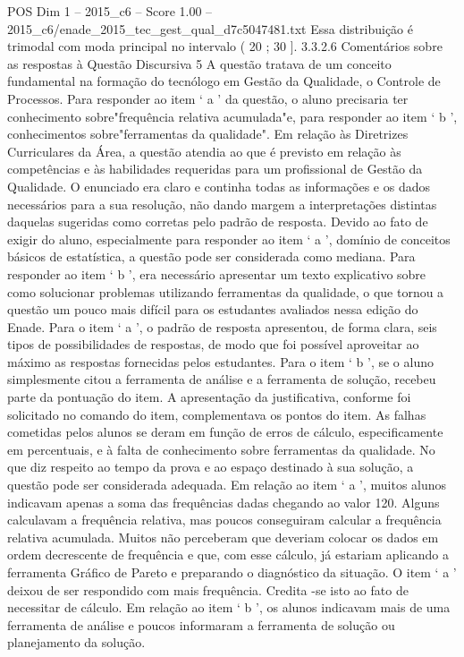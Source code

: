 \begin{textsample}{POS Dim 1 – 2015\_c6 – Score 1.00 – 2015\_c6/enade\_2015\_tec\_gest\_qual\_d7c5047481.txt}
Essa distribuição é trimodal com moda principal no intervalo ( 20 ; 30 ]. 3.3.2.6 Comentários sobre as respostas à Questão Discursiva 5 A questão tratava de um conceito fundamental na formação do tecnólogo em Gestão da Qualidade, o Controle de Processos.
Para responder ao item ‘ a ’ da questão, o aluno precisaria ter conhecimento sobre"frequência relativa acumulada"e, para responder ao item ‘ b ’, conhecimentos sobre"ferramentas da qualidade".
Em relação às Diretrizes Curriculares da Área, a questão atendia ao que é previsto em relação às competências e às habilidades requeridas para um profissional de Gestão da Qualidade.
O enunciado era claro e continha todas as informações e os dados necessários para a sua resolução, não dando margem a interpretações distintas daquelas sugeridas como corretas pelo padrão de resposta.
Devido ao fato de exigir do aluno, especialmente para responder ao item ‘ a ’, domínio de conceitos básicos de estatística, a questão pode ser considerada como mediana.
Para responder ao item ‘ b ’, era necessário apresentar um texto explicativo sobre como solucionar problemas utilizando ferramentas da qualidade, o que tornou a questão um pouco mais difícil para os estudantes avaliados nessa edição do Enade.
Para o item ‘ a ’, o padrão de resposta apresentou, de forma clara, seis tipos de possibilidades de respostas, de modo que foi possível aproveitar ao máximo as respostas fornecidas pelos estudantes.
Para o item ‘ b ’, se o aluno simplesmente citou a ferramenta de análise e a ferramenta de solução, recebeu parte da pontuação do item.
A apresentação da justificativa, conforme foi solicitado no comando do item, complementava os pontos do item.
As falhas cometidas pelos alunos se deram em função de erros de cálculo, especificamente em percentuais, e à falta de conhecimento sobre ferramentas da qualidade.
No que diz respeito ao tempo da prova e ao espaço destinado à sua solução, a questão pode ser considerada adequada.
Em relação ao item ‘ a ’, muitos alunos indicavam apenas a soma das frequências dadas chegando ao valor 120.
Alguns calculavam a frequência relativa, mas poucos conseguiram calcular a frequência relativa acumulada.
Muitos não perceberam que deveriam colocar os dados em ordem decrescente de frequência e que, com esse cálculo, já estariam aplicando a ferramenta Gráfico de Pareto e preparando o diagnóstico da situação.
O item ‘ a ’ deixou de ser respondido com mais frequência.
Credita -se isto ao fato de necessitar de cálculo.
Em relação ao item ‘ b ’, os alunos indicavam mais de uma ferramenta de análise e poucos informaram a ferramenta de solução ou planejamento da solução.

\end{textsample}
